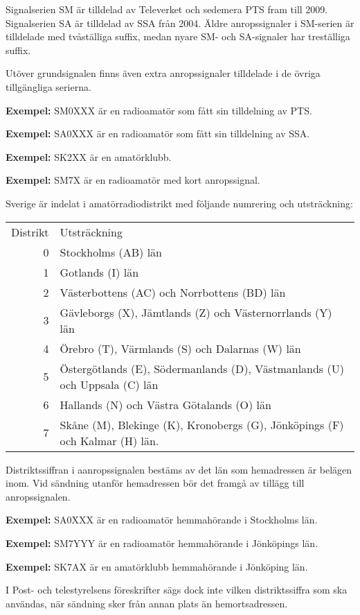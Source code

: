 Signalserien SM är tilldelad av Televerket och sedemera PTS fram till 2009.
Signalserien SA är tilldelad av SSA från 2004.
Äldre anropssignaler i SM-serien är tilldelade med tvåställiga suffix, medan nyare SM- och SA-signaler har treställiga suffix.

Utöver grundsignalen finns även extra anropssignaler tilldelade i de övriga tillgängliga serierna.

\textbf{Exempel:} SM0XXX är en radioamatör som fått sin tilldelning av PTS.

\textbf{Exempel:} SA0XXX är en radioamatör som fått sin tilldelning av SSA.

\textbf{Exempel:} SK2XX är en amatörklubb.

\textbf{Exempel:} SM7X är en radioamatör med kort anropssignal.

Sverige är indelat i amatörradiodistrikt med följande numrering och
utsträckning:

\begin{tabular}{rp{10cm}}
Distrikt & Utsträckning \\
0 & Stockholms (AB) län \\
1 & Gotlands (I) län \\
2 & Västerbottens (AC) och Norrbottens (BD) län \\
3 & Gävleborgs (X), Jämtlands (Z) och Västernorrlands (Y) län \\
4 & Örebro (T), Värmlands (S) och Dalarnas (W) län \\
5 & Östergötlands (E), Södermanlands (D), Västmanlands (U) och Uppsala (C) län\\
6 & Hallands (N) och Västra Götalands (O) län \\
7 & Skåne (M), Blekinge (K), Kronobergs (G), Jönköpings (F) och Kalmar (H) län.\\
\end{tabular}

Distriktssiffran i aanropssignalen bestäms av det län som hemadressen är belägen inom.
Vid sändning utanför hemadressen bör det framgå av tillägg till anropssignalen.

\textbf{Exempel:} SA0XXX är en radioamatör hemmahörande i Stockholms län.

\textbf{Exempel:} SM7YYY är en radioamatör hemmahörande i Jönköpings län.

\textbf{Exempel:} SK7AX är en amatörklubb hemmahörande i Jönköping län.

I Post- och telestyrelsens föreskrifter sägs dock inte vilken distriktssiffra
som ska användas, när sändning sker från annan plats än hemortsadressen.


